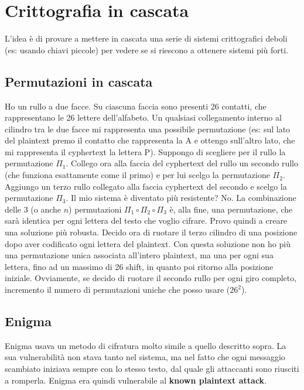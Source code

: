 \setchapterpreamble[u]{\margintoc}
\chapter{Crittografia in cascata}

L'idea è di provare a mettere in cascata una serie di sistemi crittografici deboli (es: usando chiavi piccole) per vedere se si riescono a ottenere sistemi più forti. 

\section{Permutazioni in cascata} 
Ho un rullo a due facce. Su ciascuna faccia sono presenti 26 contatti, che rappresentano le 26 lettere dell'alfabeto. Un qualsiasi collegamento interno al cilindro tra le due facce mi rappresenta una possibile permutazione (es: sul lato del plaintext premo il contatto che rappresenta la A e ottengo sull'altro lato, che mi rappresenta il cyphertext la lettera P). Suppongo di scegliere per il rullo la permutazione $\Pi_1$. Collego ora alla faccia del cyphertext del rullo un secondo rullo (che funziona esattamente come il primo) e per lui scelgo la permutazione $\Pi_2$. Aggiungo un terzo rullo collegato alla faccia cyphertext del secondo e scelgo la permutazione $\Pi_3$. Il mio sistema è diventato più resistente? No. La combinazione delle 3 (o anche $n$) permutazioni $\Pi_1 \circ \Pi_2 \circ \Pi_3$ è, alla fine, una permutazione, che sarà identica per ogni lettera del testo che voglio cifrare.
Provo quindi a creare una soluzione più robusta. Decido ora di ruotare il terzo cilindro di una posizione dopo aver codificato ogni lettera del plaintext. Con questa soluzione non ho più una permutazione unica associata all'intero plaintext, ma una per ogni sua lettera, fino ad un massimo di 26 shift, in quanto poi ritorno alla posizione iniziale. Ovviamente, se decido di ruotare il secondo rullo per ogni giro completo, incremento il numero di permutazioni uniche che posso usare ($26^2$).

\section{Enigma} 
Enigma usava un metodo di cifratura molto simile a quello descritto sopra. La sua vulnerabilità non stava tanto nel sistema, ma nel fatto che ogni messaggio scambiato iniziava sempre con lo stesso testo, dal quale gli attaccanti sono riusciti a romperla. Enigma era quindi vulnerabile al \textbf{known plaintext attack}.

